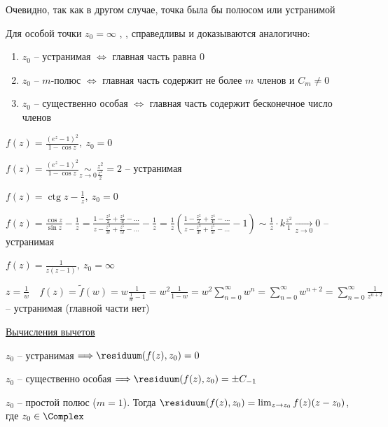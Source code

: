 \documentclass[12pt]{article}
\begin{document}
\begin{MyProof}
    Очевидно, так как в другом случае, точка была бы полюсом или устранимой
\end{MyProof}

\Nota Для особой точки $z_0 = \infty$ , ,  справедливы и доказываются аналогично:

\begin{enumerate}
    \item $z_0$ -- устранимая $\Longleftrightarrow$ главная часть равна 0
    \item $z_0$ -- $m$-полюс $\Longleftrightarrow$ главная часть содержит не более $m$ членов и $C_m \neq 0$
    \item $z_0$ -- существенно особая $\Longleftrightarrow$ главная часть содержит бесконечное число членов
\end{enumerate}

 $f(z) = \frac{(e^z - 1)^2}{1 - \cos z}, \ z_0 = 0$

$f(z) = \frac{(e^z - 1)^2}{1 - \cos z} \underset{z \to 0}{\sim} \frac{z^2}{\frac{z^2}{2}} = 2$ -- устранимая

 $f(z) = \operatorname{ctg} z - \frac{1}{z}, \ z_0 = 0$

$f(z) = \frac{\cos z}{\sin z} - \frac{1}{z} = \frac{1 - \frac{z^2}{2} + \frac{z^4}{4!} - \dots}{z - \frac{z^3}{3!} + \frac{z^5}{5!} - \dots} - \frac{1}{z} = \frac{1}{z} \left(\frac{1 - \frac{z^2}{2} + \frac{z^4}{4!} - \dots}{z - \frac{z^3}{3!} + \frac{z^5}{5!} - \dots} - 1\right) \sim \frac{1}{z} \cdot k \frac{z^2}{1} \underset{z \to 0}{\longrightarrow} 0$ -- устранимая

 $f(z) = \frac{1}{z(z - 1)}, \ z_0 = \infty$

$z = \frac{1}{w} \quad f(z) = \tilde f(w) = w \frac{1}{\frac{1}{w} - 1} = w^2 \frac{1}{1 - w} = w^2 \sum_{n = 0}^\infty w^n = \sum_{n = 0}^\infty w^{n + 2} = \sum_{n = 0}^\infty \frac{1}{z^{n + 2}}$ -- устранимая (главной части нет)

\mediumvspace

\underline{Вычисления вычетов}

\Nota $z_0$ -- устранимая $\Longrightarrow \residuum(f(z), z_0) = 0$

$z_0$ -- существенно особая $\Longrightarrow \residuum(f(z), z_0) = \pm C_{-1}$

\begin{MyTheorem}
    \Ths $z_0$ -- простой полюс ($m = 1$). Тогда $\residuum(f(z), z_0) = \lim_{z \to z_0} f(z) (z - z_0)$, где $z_0 \in \Complex$
\end{MyTheorem}
\end{document}
